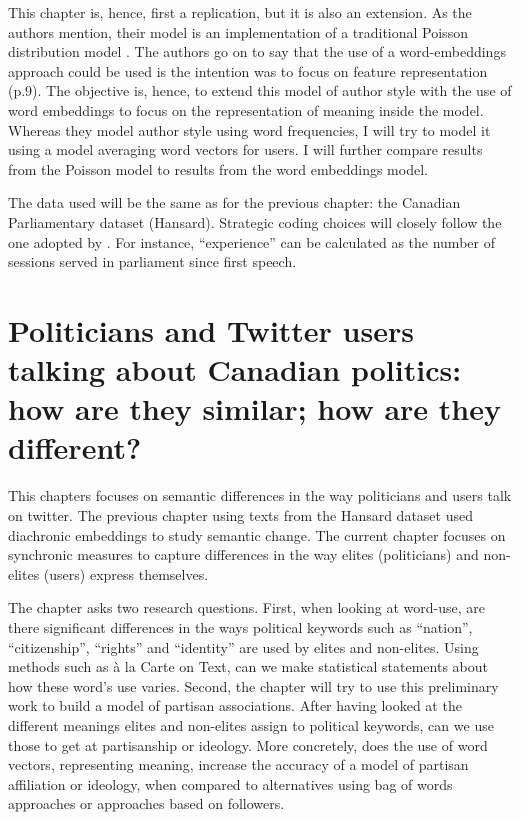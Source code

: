 \documentclass[
  openany]{book}
\begin{document}
This chapter is, hence, first a replication, but it is also an extension. As the authors mention, their model is an implementation of a traditional Poisson distribution model \citep{mosteller1963inference}. The authors go on to say that the use of a word-embeddings approach could be used is the intention was to focus on feature representation (p.9). The objective is, hence, to extend this model of author style with the use of word embeddings to focus on the representation of meaning inside the model. Whereas they model author style using word frequencies, I will try to model it using a model averaging word vectors for users. I will further compare results from the Poisson model to results from the word embeddings model.

The data used will be the same as for the previous chapter: the Canadian Parliamentary dataset (Hansard). Strategic coding choices will closely follow the one adopted by \citet{huang2020general}. For instance, ``experience'' can be calculated as the number of sessions served in parliament since first speech.

\hypertarget{politicians-and-twitter-users-talking-about-canadian-politics-how-are-they-similar-how-are-they-different}{%
\chapter{Politicians and Twitter users talking about Canadian politics: how are they similar; how are they different?}\label{politicians-and-twitter-users-talking-about-canadian-politics-how-are-they-similar-how-are-they-different}}

This chapters focuses on semantic differences in the way politicians and users talk on twitter. The previous chapter using texts from the Hansard dataset used diachronic embeddings to study semantic change. The current chapter focuses on synchronic measures to capture differences in the way elites (politicians) and non-elites (users) express themselves.

The chapter asks two research questions. First, when looking at word-use, are there significant differences in the ways political keywords such as ``nation'', ``citizenship'', ``rights'' and ``identity'' are used by elites and non-elites. Using methods such as à la Carte on Text, can we make statistical statements about how these word's use varies. Second, the chapter will try to use this preliminary work to build a model of partisan associations. After having looked at the different meanings elites and non-elites assign to political keywords, can we use those to get at partisanship or ideology. More concretely, does the use of word vectors, representing meaning, increase the accuracy of a model of partisan affiliation or ideology, when compared to alternatives using bag of words approaches or approaches based on followers.
\end{document}
